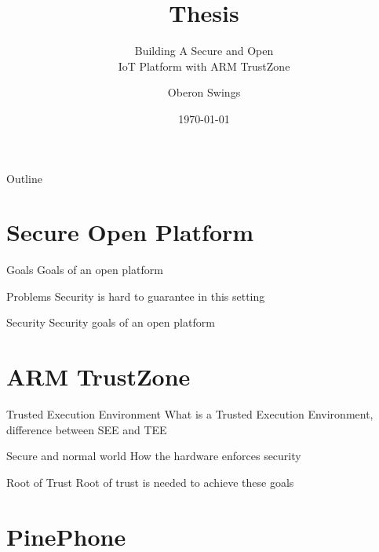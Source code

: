 \documentclass[]{beamer}
\title{Thesis}
\subtitle{Building A Secure and Open \\ IoT Platform with ARM TrustZone}
\author{Oberon Swings}
\institute{KU Leuven}
\date{\today}
\begin{document}
{
		\maketitle
	}
	\addtocounter{framenumber}{-1} %
	
\iftrue
\begin{frame}{Outline}
	\hfill	{\large \parbox{.961\textwidth}{\tableofcontents[hideothersubsections]}}
\end{frame}
\fi

\section{Secure Open Platform}

\begin{frame}{Goals}
Goals of an open platform
\end{frame}

\begin{frame}{Problems}
Security is hard to guarantee in this setting
\end{frame}

\begin{frame}{Security}
Security goals of an open platform
\end{frame}

\section{ARM TrustZone}

\begin{frame}{Trusted Execution Environment}
What is a Trusted Execution Environment, difference between SEE and TEE
\end{frame}

\begin{frame}{Secure and normal world}
How the hardware enforces security
\end{frame}

\begin{frame}{Root of Trust}
Root of trust is needed to achieve these goals
\end{frame}

\section{PinePhone}
\end{document}
